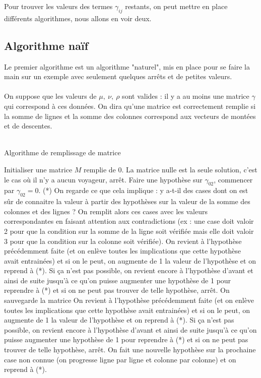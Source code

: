 \documentclass[12pt]{article}
\begin{document}
Pour trouver les valeurs des termes $\gamma_{ij}$ restants, on peut mettre en place différents algorithmes, nous allons en voir deux.
\subsection{Algorithme naïf}
Le premier algorithme est un algorithme "naturel", mis en place pour se faire la main sur un exemple avec seulement quelques arrêts et de petites valeurs.\\
\\
On suppose que les valeurs de $\mu,\:\nu,\:\rho$ sont valides : il y a au moins une matrice $\gamma$ qui correspond à ces données. On dira qu'une matrice est correctement remplie si la somme de lignes et la somme des colonnes correspond aux vecteurs de montées et de descentes.\\
\\
\begin{algorithm}
\caption{Algorithme de remplissage de matrice}
\begin{algorithmic}
    \State Initialiser une matrice $M$ remplie de 0.
        \State La matrice nulle est la seule solution, c'est le cas où il n'y a aucun voyageur, arrêt.
    \Else
        \State Faire une hypothèse sur $\gamma_{02}$, commencer par $\gamma_{02} = 0$.
        \State (*) On regarde ce que cela implique : y a-t-il des cases dont on est sûr de connaitre la valeur à partir des hypothèses sur la valeur de la somme des colonnes et des lignes ? On remplit alors ces cases avec les valeurs correspondantes en faisant attention aux contradictions (ex : une case doit valoir 2 pour que la condition sur la somme de la ligne soit vérifiée mais elle doit valoir 3 pour que la condition sur la colonne soit vérifiée).
            \State On revient à l’hypothèse précédemment faite (et on enlève toutes les implications que cette hypothèse avait entrainées) et si on le peut, on augmente de 1 la valeur de l’hypothèse et on reprend à (*). Si ça n’est pas possible, on revient encore à l’hypothèse d’avant et ainsi de suite jusqu’à ce qu’on puisse augmenter une hypothèse de 1 pour reprendre à (*) et si on ne peut pas trouver de telle hypothèse, arrêt.
        \Else
                \State On sauvegarde la matrice
                \State On revient à l’hypothèse précédemment faite (et on enlève toutes les implications que cette hypothèse avait entrainées) et si on le peut, on augmente de 1 la valeur de l’hypothèse et on reprend à (*). Si ça n’est pas possible, on revient encore à l’hypothèse d’avant et ainsi de suite jusqu’à ce qu’on puisse augmenter une hypothèse de 1 pour reprendre à (*) et si on ne peut pas trouver de telle hypothèse, arrêt.
             \Else
                \State On fait une nouvelle hypothèse sur la prochaine case non connue (on progresse ligne par ligne et colonne par colonne) et on reprend à (*).
            \EndIf
        \EndIf
    \EndIf
\end{algorithmic}
\end{algorithm}
\end{document}
